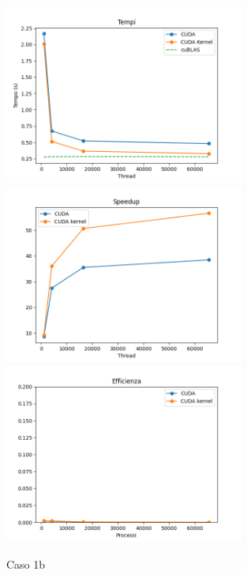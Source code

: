 \begin{figure}[h]
    \centering
    \includegraphics[width=0.7\textwidth]{./imgs/graphs/caso_a2.png}
    \includegraphics[width=0.7\textwidth]{./imgs/graphs/caso_a2_speedup.png}
    \includegraphics[width=0.7\textwidth]{./imgs/graphs/caso_a2_efficiency.png}
    \caption{Caso 1b}
\end{figure}

